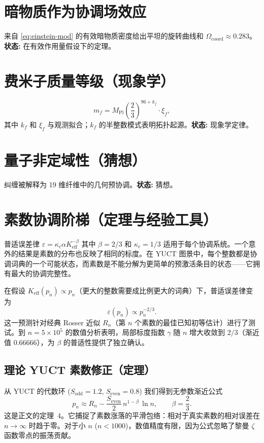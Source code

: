 \documentclass[11pt,a4paper]{article}
\newcommand{\coord}{\mathrm{coord}}
\begin{document}
	\section{暗物质作为协调场效应}
	\label{sec:DM}
	来自 \eqref{eq:einstein-mod} 的有效暗物质密度给出平坦的旋转曲线和 \(\Omega_{\coord} \approx 0.283\)。\textbf{状态:} 在有效作用量假设下的定理。
	
	\section{费米子质量等级（现象学）}
	\label{sec:masses}
	\[
	m_f = M_{\mathrm{Pl}} \left(\frac{2}{3}\right)^{96 + k_f} \cdot \xi_f,
	\]
	其中 \(k_f\) 和 \(\xi_f\) 与观测拟合；\(k_f\) 的半整数模式表明拓扑起源。\textbf{状态:} 现象学定律。
	
	\section{量子非定域性（猜想）}
	\label{sec:nonlocality}
	纠缠被解释为 19 维纤维中的几何预协调。\textbf{状态:} 猜想。
	
	\section{素数协调阶梯（定理与经验工具）}
	\label{sec:primes}
	
	普适误差律 \(\varepsilon = \kappa_c\alpha K_{\mathrm{eff}}^{-\beta}\) 其中 \(\beta=2/3\) 和 \(\kappa_c=1/3\) 适用于每个协调系统。一个意外的结果是素数的分布也反映了相同的标度。在 YUCT 图景中，每个整数都是协调词典的一个可能状态，而素数是不能分解为更简单的预激活条目的状态——它拥有最大的协调完整性。
	
	在假设 \(K_{\mathrm{eff}}(p_n) \propto p_n\)（更大的整数需要成比例更大的词典）下，普适误差律变为
	\[
	\varepsilon(p_n) \propto p_n^{-2/3}.
	\]
	这一预测针对经典 Rosser 近似 \(R_n\)（第 \(n\) 个素数的最佳已知初等估计）进行了测试。到 \(n = 5\times10^5\) 的数值分析表明，局部标度指数 \(\gamma\) 随 \(n\) 增大收敛到 \(2/3\)（渐近值 \(0.66666\)），为 \(\beta\) 的普适性提供了独立确认。
	
	\subsection{理论 YUCT 素数修正（定理）}
	
	从 YUCT 的代数环 (\(S_{\mathrm{odd}}=1.2\), \(S_{\mathrm{even}}=0.8\)) 我们得到无参数渐近公式
	\[
	\boxed{p_n \approx R_n - \frac{S_{\mathrm{even}}}{2}\, n^{1-\beta}\,\ln n},
	\qquad \beta = \frac{2}{3}.
	\]
	这是正文的定理~4。它捕捉了素数涨落的平滑包络：相对于真实素数的相对误差在 \(n\to\infty\) 时趋于零。对于小 \(n\) (\(n < 1000\))，数值精度有限，因为公式忽略了黎曼 \(\zeta\) 函数零点的振荡贡献。
	
\end{document}
